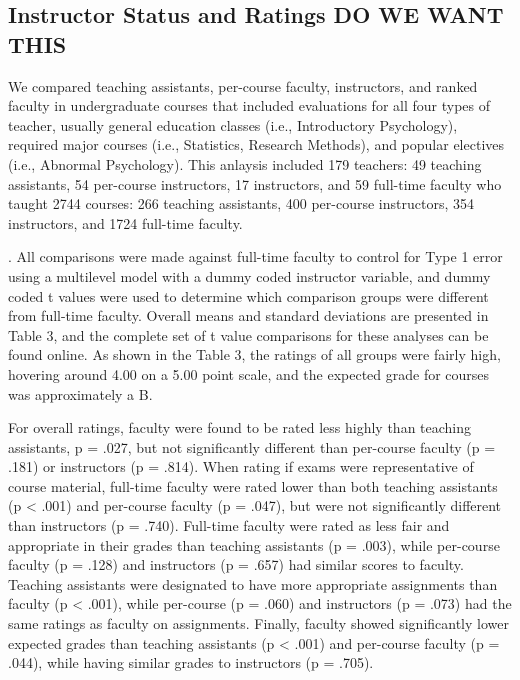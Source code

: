 \documentclass[man]{apa6}
\theoremstyle{definition}
\theoremstyle{definition}
\theoremstyle{definition}
\theoremstyle{remark}
\begin{document}
\hypertarget{instructor-status-and-ratings-do-we-want-this}{%
\subsection{Instructor Status and Ratings DO WE WANT
THIS}\label{instructor-status-and-ratings-do-we-want-this}}

We compared teaching assistants, per-course faculty, instructors, and
ranked faculty in undergraduate courses that included evaluations for
all four types of teacher, usually general education classes (i.e.,
Introductory Psychology), required major courses (i.e., Statistics,
Research Methods), and popular electives (i.e., Abnormal Psychology).
This anlaysis included 179 teachers: 49 teaching assistants, 54
per-course instructors, 17 instructors, and 59 full-time faculty who
taught 2744 courses: 266 teaching assistants, 400 per-course
instructors, 354 instructors, and 1724 full-time faculty.

. All comparisons were made against full-time faculty to control for
Type 1 error using a multilevel model with a dummy coded instructor
variable, and dummy coded t values were used to determine which
comparison groups were different from full-time faculty. Overall means
and standard deviations are presented in Table 3, and the complete set
of t value comparisons for these analyses can be found online. As shown
in the Table 3, the ratings of all groups were fairly high, hovering
around 4.00 on a 5.00 point scale, and the expected grade for courses
was approximately a B.

For overall ratings, faculty were found to be rated less highly than
teaching assistants, p = .027, but not significantly different than
per-course faculty (p = .181) or instructors (p = .814). When rating if
exams were representative of course material, full-time faculty were
rated lower than both teaching assistants (p \textless{} .001) and
per-course faculty (p = .047), but were not significantly different than
instructors (p = .740). Full-time faculty were rated as less fair and
appropriate in their grades than teaching assistants (p = .003), while
per-course faculty (p = .128) and instructors (p = .657) had similar
scores to faculty. Teaching assistants were designated to have more
appropriate assignments than faculty (p \textless{} .001), while
per-course (p = .060) and instructors (p = .073) had the same ratings as
faculty on assignments. Finally, faculty showed significantly lower
expected grades than teaching assistants (p \textless{} .001) and
per-course faculty (p = .044), while having similar grades to
instructors (p = .705).
\end{document}
